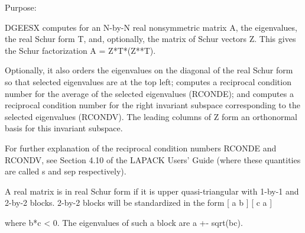  \begin{DoxyParagraph}{Purpose\+: }
\begin{DoxyVerb} DGEESX computes for an N-by-N real nonsymmetric matrix A, the
 eigenvalues, the real Schur form T, and, optionally, the matrix of
 Schur vectors Z.  This gives the Schur factorization A = Z*T*(Z**T).

 Optionally, it also orders the eigenvalues on the diagonal of the
 real Schur form so that selected eigenvalues are at the top left;
 computes a reciprocal condition number for the average of the
 selected eigenvalues (RCONDE); and computes a reciprocal condition
 number for the right invariant subspace corresponding to the
 selected eigenvalues (RCONDV).  The leading columns of Z form an
 orthonormal basis for this invariant subspace.

 For further explanation of the reciprocal condition numbers RCONDE
 and RCONDV, see Section 4.10 of the LAPACK Users' Guide (where
 these quantities are called s and sep respectively).

 A real matrix is in real Schur form if it is upper quasi-triangular
 with 1-by-1 and 2-by-2 blocks. 2-by-2 blocks will be standardized in
 the form
           [  a  b  ]
           [  c  a  ]

 where b*c < 0. The eigenvalues of such a block are a +- sqrt(bc).\end{DoxyVerb}
 
\end{DoxyParagraph}

